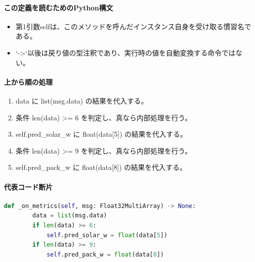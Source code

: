 \documentclass[a4paper,11pt]{article}
\begin{document}
            \paragraph{この定義を読むためのPython構文}
            \begin{itemize}[leftmargin=1.6em]
            \item 第1引数selfは、このメソッドを呼んだインスタンス自身を受け取る慣習名である。
\item `->`以後は戻り値の型注釈であり、実行時の値を自動変換する命令ではない。
            \end{itemize}
            \paragraph{上から順の処理}
            \begin{enumerate}[leftmargin=1.8em]
            \item data に list(msg.data) の結果を代入する。
\item 条件 len(data) >= 6 を判定し、真なら内部処理を行う。
\item   self.pred\_solar\_w に float(data[5]) の結果を代入する。
\item 条件 len(data) >= 9 を判定し、真なら内部処理を行う。
\item   self.pred\_pack\_w に float(data[8]) の結果を代入する。
            \end{enumerate}
            \paragraph{代表コード断片}
            \begin{lstlisting}[language=Python]
    def _on_metrics(self, msg: Float32MultiArray) -> None:
        data = list(msg.data)
        if len(data) >= 6:
            self.pred_solar_w = float(data[5])
        if len(data) >= 9:
            self.pred_pack_w = float(data[8])
\end{lstlisting}
\end{document}
